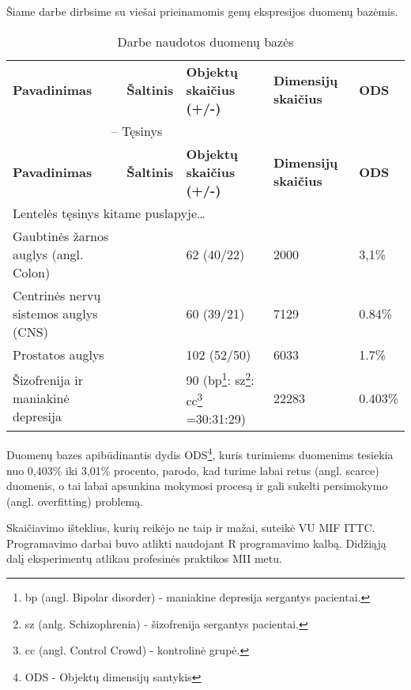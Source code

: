 Šiame darbe dirbsime su viešai prieinamomis genų ekspresijos duomenų bazėmis.
\begin{longtable}{|p{4cm}|p{1.4cm}|p{2.5cm}|p{1.6cm}|p{1cm}|}
\captionsetup{labelsep=period}
\caption{Darbe naudotos duomenų bazės\label{table:datasets}}\\
\hline \hline
{\textbf{Pavadinimas}} &
{\textbf{Šaltinis}} &
{\textbf{Objektų skaičius (+/-)}}&
{\textbf{Dimensijų skaičius}}&
{\textbf{ODS}}\\
\hline
\endfirsthead
\multicolumn{3}{c}{{\tablename} \thetable{} -- Tęsinys} \\[0.5ex]
\hline \hline
{\textbf{Pavadinimas}} &
{\textbf{Šaltinis}} &
{\textbf{Objektų skaičius (+/-)}}&
{\textbf{Dimensijų skaičius}}&
{\textbf{ODS}}\\
\hline
\endhead
\multicolumn{3}{l}{{Lentelės tęsinys kitame puslapyje\ldots}} \\
\endfoot
\hline \hline
\endlastfoot
\hline 
Gaubtinės žarnos auglys (angl. Colon) 
& 
\cite{alon1999broad} 
& 
62 (40/22) 
& 
2000 
& 
3,1\% \\
\hline
Centrinės nervų sistemos auglys (CNS) 
& 
\cite{pomeroy2002prediction} 
& 
60 (39/21) 
& 
7129 
& 
0.84\% \\
\hline
Prostatos auglys 
& 
\cite{singh2002gene} 
& 
102 (52/50) 
& 
6033 
& 
1.7\% \\
\hline
Šizofrenija ir maniakinė depresija
&
\cite{altara}
&
90 (bp\footnote{bp (angl. Bipolar disorder) - maniakine depresija sergantys pacientai.}:
sz\footnote{sz (anlg. Schizophrenia) - šizofrenija sergantys pacientai.}:
cc\footnote{cc (angl. Control Crowd) - kontrolinė grupė.} =30:31:29)
&
22283
&
0.403\% \\
\hline
\end{longtable}
Duomenų bazes apibūdinantis dydis ODS\footnote{ODS - Objektų dimensijų santykis},
kuris turimiems duomenims tesiekia nuo  0,403\% iki 3,01\% procento,
parodo, kad turime labai retus (angl. scarce) duomenis, o tai labai apsunkina
mokymosi procesą ir gali sukelti persimokymo (angl. overfitting) problemą.

Skaičiavimo išteklius, kurių reikėjo ne taip ir mažai, suteikė VU MIF ITTC.
Programavimo darbai buvo atlikti naudojant R programavimo kalbą. Didžiąją
dalį eksperimentų atlikau profesinės praktikos MII metu.

